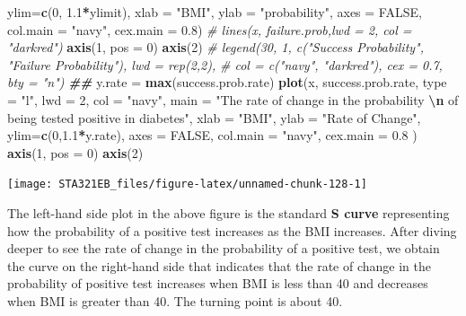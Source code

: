 \documentclass[
]{book}
\newenvironment{Shaded}{\begin{snugshade}}{\end{snugshade}}
\newcommand{\AttributeTok}[1]{\textcolor[rgb]{0.13,0.29,0.53}{#1}}
\newcommand{\CommentTok}[1]{\textcolor[rgb]{0.56,0.35,0.01}{\textit{#1}}}
\newcommand{\ConstantTok}[1]{\textcolor[rgb]{0.56,0.35,0.01}{#1}}
\newcommand{\DecValTok}[1]{\textcolor[rgb]{0.00,0.00,0.81}{#1}}
\newcommand{\DocumentationTok}[1]{\textcolor[rgb]{0.56,0.35,0.01}{\textbf{\textit{#1}}}}
\newcommand{\FloatTok}[1]{\textcolor[rgb]{0.00,0.00,0.81}{#1}}
\newcommand{\FunctionTok}[1]{\textcolor[rgb]{0.13,0.29,0.53}{\textbf{#1}}}
\newcommand{\NormalTok}[1]{#1}
\newcommand{\OtherTok}[1]{\textcolor[rgb]{0.56,0.35,0.01}{#1}}
\newcommand{\SpecialCharTok}[1]{\textcolor[rgb]{0.81,0.36,0.00}{\textbf{#1}}}
\newcommand{\StringTok}[1]{\textcolor[rgb]{0.31,0.60,0.02}{#1}}
\begin{document}
\begin{Shaded}
\begin{Highlighting}[]
     \AttributeTok{ylim=}\FunctionTok{c}\NormalTok{(}\DecValTok{0}\NormalTok{, }\FloatTok{1.1}\SpecialCharTok{*}\NormalTok{ylimit),}
     \AttributeTok{xlab =} \StringTok{"BMI"}\NormalTok{,}
     \AttributeTok{ylab =} \StringTok{"probability"}\NormalTok{,}
     \AttributeTok{axes =} \ConstantTok{FALSE}\NormalTok{,}
     \AttributeTok{col.main =} \StringTok{"navy"}\NormalTok{,}
     \AttributeTok{cex.main =} \FloatTok{0.8}\NormalTok{)}
\CommentTok{\# lines(x, failure.prob,lwd = 2, col = "darkred")}
\FunctionTok{axis}\NormalTok{(}\DecValTok{1}\NormalTok{, }\AttributeTok{pos =} \DecValTok{0}\NormalTok{)}
\FunctionTok{axis}\NormalTok{(}\DecValTok{2}\NormalTok{)}
\CommentTok{\# legend(30, 1, c("Success Probability", "Failure Probability"), lwd = rep(2,2), }
\CommentTok{\#       col = c("navy", "darkred"), cex = 0.7, bty = "n")}
\DocumentationTok{\#\#}
\NormalTok{y.rate }\OtherTok{=} \FunctionTok{max}\NormalTok{(success.prob.rate)}
\FunctionTok{plot}\NormalTok{(x, success.prob.rate, }\AttributeTok{type =} \StringTok{"l"}\NormalTok{, }\AttributeTok{lwd =} \DecValTok{2}\NormalTok{, }\AttributeTok{col =} \StringTok{"navy"}\NormalTok{,}
     \AttributeTok{main =} \StringTok{"The rate of change in the probability }\SpecialCharTok{\textbackslash{}n}\StringTok{  of being tested positive in diabetes"}\NormalTok{, }
     \AttributeTok{xlab =} \StringTok{"BMI"}\NormalTok{,}
     \AttributeTok{ylab =} \StringTok{"Rate of Change"}\NormalTok{,}
     \AttributeTok{ylim=}\FunctionTok{c}\NormalTok{(}\DecValTok{0}\NormalTok{,}\FloatTok{1.1}\SpecialCharTok{*}\NormalTok{y.rate),}
     \AttributeTok{axes =} \ConstantTok{FALSE}\NormalTok{,}
     \AttributeTok{col.main =} \StringTok{"navy"}\NormalTok{,}
     \AttributeTok{cex.main =} \FloatTok{0.8}
\NormalTok{     )}
\FunctionTok{axis}\NormalTok{(}\DecValTok{1}\NormalTok{, }\AttributeTok{pos =} \DecValTok{0}\NormalTok{)}
\FunctionTok{axis}\NormalTok{(}\DecValTok{2}\NormalTok{)}
\end{Highlighting}
\end{Shaded}

\begin{center}\texttt{[image: STA321EB\_files/figure-latex/unnamed-chunk-128-1]} \end{center}

The left-hand side plot in the above figure is the standard \textbf{S curve} representing how the probability of a positive test increases as the BMI increases. After diving deeper to see the rate of change in the probability of a positive test, we obtain the curve on the right-hand side that indicates that the rate of change in the probability of positive test increases when BMI is less than 40 and decreases when BMI is greater than 40. The turning point is about 40.
\end{document}
